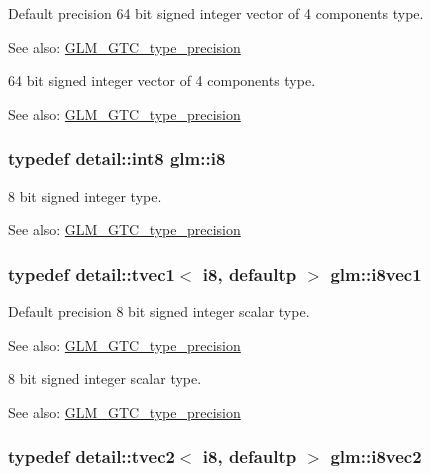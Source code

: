 Default precision 64 bit signed integer vector of 4 components type. \begin{Desc}
\item[See also:]\hyperlink{group__gtc__type__precision}{GLM\_\-GTC\_\-type\_\-precision}\end{Desc}
64 bit signed integer vector of 4 components type. \begin{Desc}
\item[See also:]\hyperlink{group__gtc__type__precision}{GLM\_\-GTC\_\-type\_\-precision} \end{Desc}
\hypertarget{group__gtc__type__precision_gae064be68b7d36cd7910c16e8ad18bba}{
\subsubsection[i8]{\setlength{\rightskip}{0pt plus 5cm}typedef detail::int8 {\bf glm::i8}}}
\label{group__gtc__type__precision_gae064be68b7d36cd7910c16e8ad18bba}


8 bit signed integer type. \begin{Desc}
\item[See also:]\hyperlink{group__gtc__type__precision}{GLM\_\-GTC\_\-type\_\-precision} \end{Desc}
\hypertarget{group__gtc__type__precision_ge67d2e1e7ebd1a79176cac554395b881}{
\subsubsection[i8vec1]{\setlength{\rightskip}{0pt plus 5cm}typedef detail::tvec1$<$ i8, defaultp $>$ {\bf glm::i8vec1}}}
\label{group__gtc__type__precision_ge67d2e1e7ebd1a79176cac554395b881}


Default precision 8 bit signed integer scalar type. \begin{Desc}
\item[See also:]\hyperlink{group__gtc__type__precision}{GLM\_\-GTC\_\-type\_\-precision}\end{Desc}
8 bit signed integer scalar type. \begin{Desc}
\item[See also:]\hyperlink{group__gtc__type__precision}{GLM\_\-GTC\_\-type\_\-precision} \end{Desc}
\hypertarget{group__gtc__type__precision_gfd7bbd3878c298014276975f999a8677}{
\subsubsection[i8vec2]{\setlength{\rightskip}{0pt plus 5cm}typedef detail::tvec2$<$ i8, defaultp $>$ {\bf glm::i8vec2}}}
\label{group__gtc__type__precision_gfd7bbd3878c298014276975f999a8677}


